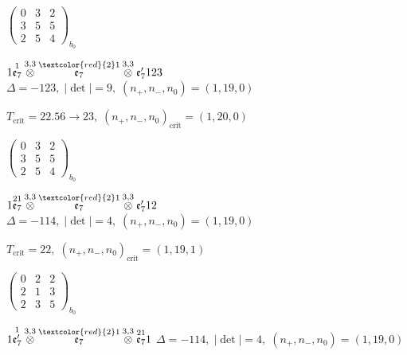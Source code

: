\documentclass[10pt]{article}
\begin{document}
\hspace{2em}$\left(\begin{smallmatrix}0 & 3 & 2 \\ 3 & 5 & 5 \\ 2 & 5 & 4\end{smallmatrix}\right)_{\!b_0}$

\smallskip

$1\overset{1}{\mathfrak{e}_7}\overset{3,3}{\otimes}\overset{\textcolor{red}{2}1}{\mathfrak{e}_7}\overset{3,3}{\otimes}\mathfrak{e}_7'123$ \quad $\Delta=-123,\; |\det|=9,\; (n_+,n_-,n_0)=(1,19,0)$

\hspace{1em}$T_{\text{crit}}=22.56 \to 23,\; (n_+,n_-,n_0)_{\text{crit}}=(1,20,0)$

\hspace{2em}$\left(\begin{smallmatrix}0 & 3 & 2 \\ 3 & 5 & 5 \\ 2 & 5 & 4\end{smallmatrix}\right)_{\!b_0}$

\smallskip

$1\overset{21}{\mathfrak{e}_7}\overset{3,3}{\otimes}\overset{\textcolor{red}{2}1}{\mathfrak{e}_7}\overset{3,3}{\otimes}\mathfrak{e}_7'12$ \quad $\Delta=-114,\; |\det|=4,\; (n_+,n_-,n_0)=(1,19,0)$

\hspace{1em}$T_{\text{crit}}=22,\; (n_+,n_-,n_0)_{\text{crit}}=(1,19,1)$

\hspace{2em}$\left(\begin{smallmatrix}0 & 2 & 2 \\ 2 & 1 & 3 \\ 2 & 3 & 5\end{smallmatrix}\right)_{\!b_0}$

\smallskip

$1\overset{1}{\mathfrak{e}_7'}\overset{3,3}{\otimes}\overset{\textcolor{red}{2}1}{\mathfrak{e}_7}\overset{3,3}{\otimes}\overset{21}{\mathfrak{e}_7}1$ \quad $\Delta=-114,\; |\det|=4,\; (n_+,n_-,n_0)=(1,19,0)$
\end{document}
